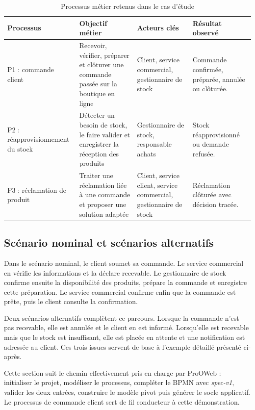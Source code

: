 \begin{table}[H]
\centering
\caption{Processus métier retenus dans le cas d'étude}
\label{tab:chap4-processus-retenus}
\begin{tabularx}{\textwidth}{p{2.5cm}p{3.6cm}p{2.7cm}X}
\toprule
\textbf{Processus} & \textbf{Objectif métier} & \textbf{Acteurs clés} & \textbf{Résultat observé} \\
\midrule
P1 : commande client & Recevoir, vérifier, préparer et clôturer une commande passée sur la boutique en ligne & Client, service commercial, gestionnaire de stock & Commande confirmée, préparée, annulée ou clôturée. \\
P2 : réapprovisionnement du stock & Détecter un besoin de stock, le faire valider et enregistrer la réception des produits & Gestionnaire de stock, responsable achats & Stock réapprovisionné ou demande refusée. \\
P3 : réclamation de produit & Traiter une réclamation liée à une commande et proposer une solution adaptée & Client, service client, service commercial, gestionnaire de stock & Réclamation clôturée avec décision tracée. \\
\bottomrule
\end{tabularx}
\end{table}

\subsection{Scénario nominal et scénarios alternatifs}

Dans le scénario nominal, le client soumet sa commande. Le service commercial
en vérifie les informations et la déclare recevable. Le gestionnaire de stock
confirme ensuite la disponibilité des produits, prépare la commande et
enregistre cette préparation. Le service commercial confirme enfin que la
commande est prête, puis le client consulte la confirmation.

Deux scénarios alternatifs complètent ce parcours. Lorsque la commande n'est
pas recevable, elle est annulée et le client en est informé. Lorsqu'elle est
recevable mais que le stock est insuffisant, elle est placée en attente et une
notification est adressée au client. Ces trois issues servent de base à
l'exemple détaillé présenté ci-après.

\label{sec:chap4-exemple-commande}

Cette section suit le chemin effectivement pris en charge par ProOWeb :
initialiser le projet, modéliser le processus, compléter le BPMN avec
\textit{spec-v1}, valider les deux entrées, construire le modèle pivot puis
générer le socle applicatif. Le processus de commande client sert de fil
conducteur à cette démonstration.

